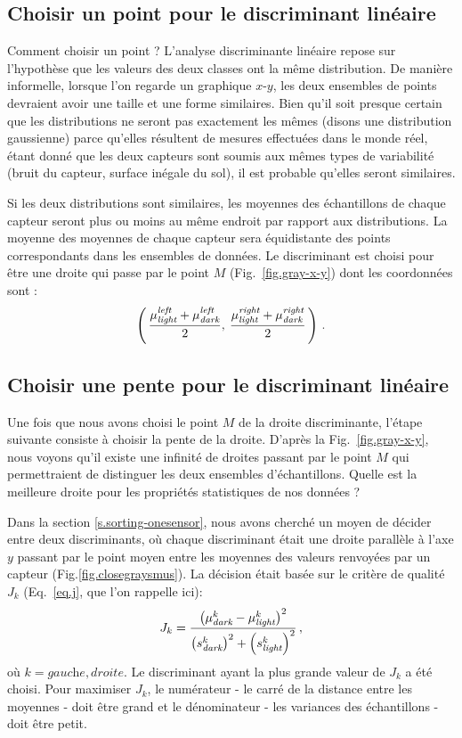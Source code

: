 \subsection{Choisir un point pour le discriminant linéaire}

Comment choisir un point ? L'analyse discriminante linéaire repose sur l'hypothèse que les valeurs des deux classes ont la même distribution. De manière informelle, lorsque l'on regarde un graphique $x$-$y$, les deux ensembles de points devraient avoir une taille et une forme similaires. Bien qu'il soit presque certain que les distributions ne seront pas exactement les mêmes (disons une distribution gaussienne) parce qu'elles résultent de mesures effectuées dans le monde réel, étant donné que les deux capteurs sont soumis aux mêmes types de variabilité (bruit du capteur, surface inégale du sol), il est probable qu'elles seront similaires.

Si les deux distributions sont similaires, les moyennes des échantillons de chaque capteur seront plus ou moins au même endroit par rapport aux distributions. La moyenne des moyennes de chaque capteur sera équidistante des points correspondants dans les ensembles de données. Le discriminant est choisi pour être une droite qui passe par le point $M$ (Fig.~\ref{fig.gray-x-y}) dont les coordonnées sont :
\[
\left(\,
\frac{\mu_{\textit{\scriptsize light}}^{\textit{\scriptsize left }}+\mu_{\textit{\scriptsize dark}}^{\textit{\scriptsize left }}}{2},\:\frac{\mu_{\textit{\scriptsize light}}^{\textit{\scriptsize right}}+\mu_{\textit{\scriptsize dark}}^{\textit{\scriptsize right}}}{2}
\,\right)\,.
\]

\subsection{Choisir une pente pour le discriminant linéaire}

Une fois que nous avons choisi le point $M$ de la droite discriminante, l'étape suivante consiste à choisir la pente de la droite. D'après la Fig.~\ref{fig.gray-x-y}, nous voyons qu'il existe une infinité de droites passant par le point $M$ qui permettraient de distinguer les deux ensembles d'échantillons. Quelle est la meilleure droite pour les propriétés statistiques de nos données ?

Dans la section \ref{s.sorting-onesensor}, nous avons cherché un moyen de décider entre deux discriminants, où chaque discriminant était une droite parallèle à l'axe $y$ passant par le point moyen entre les moyennes des valeurs renvoyées par un capteur (Fig.\ref{fig.closegraysmus}). La décision était basée sur le critère de qualité $J_k$ (Eq.~\ref{eq.j}, que l'on rappelle ici):
\begin{equation}
J_k = \frac{\left(\mu_{\textit{\scriptsize dark}}^k - \mu_{\textit{\scriptsize light}}^k\right)^2}{\left(s_{\textit{\scriptsize dark}}^k\right)^2 + \left(s_{\textit{\scriptsize light}}^k\right)^2}\,,\label{eq.j-repeat}
\end{equation}
où $k=\textit{gauche},\textit{droite}$. Le discriminant ayant la plus grande valeur de $J_k$ a été choisi. Pour maximiser $J_k$, le numérateur - le carré de la distance entre les moyennes - doit être grand et le dénominateur - les variances des échantillons - doit être petit.

